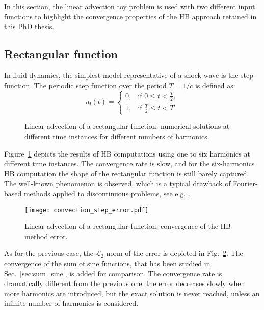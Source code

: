 
In this section, the linear advection toy problem is used
with two different input functions to highlight the convergence
properties of the HB approach retained in this PhD thesis.

\subsection{Rectangular function}

In fluid dynamics, the simplest model 
representative of a shock wave
is the step function.
The periodic step function over the period $T=1/c$ is defined as:
\begin{equation}
    u_l(t) = 
    \begin{cases}
        0, & \text{if } 0 \leq t < \frac{T}{2}, \\
        1, & \text{if } \frac{T}{2} \leq t < T.
    \end{cases}
    \label{eq:inject_step}
\end{equation}

\begin{figure}[htb]
  \centering
  \caption{Linear advection of a rectangular function: 
  numerical solutions at different time instances for different numbers of harmonics.}

  \label{fig:inj_step_results}
\end{figure}

Figure~\ref{fig:inj_step_results} depicts the results of HB computations
using one to six harmonics at different time instances. The convergence rate 
is slow, and for the six-harmonics HB computation the
shape of the rectangular function is still barely captured. 
The well-known \citet{Gibbs1899}
phenomenon is observed, which is a typical drawback 
of Fourier-based methods applied to discontinuous problems, 
see e.g. \citet{Canuto2006}.

\begin{figure}[htb]
  \centering
  \texttt{[image: convection\_step\_error.pdf]}
  \caption{Linear advection of a rectangular function: convergence of the HB method error.}
  \label{fig:conv_step}
\end{figure}
As for the previous case, the $\mathcal{L}_2$-norm 
of the error is depicted in Fig.~\ref{fig:conv_step}. 
The convergence of the sum of sine functions, that has been studied in Sec.~\ref{sec:sum_sine},
is added for comparison.
The convergence rate is dramatically different from the previous one: 
the error decreases slowly when more harmonics are introduced, 
but the exact solution is never reached, 
unless an infinite number of harmonics is considered.

